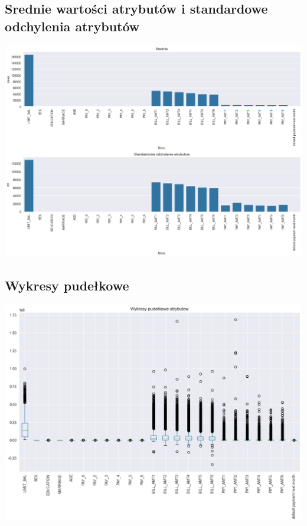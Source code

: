 \documentclass{article}
\begin{document}
\subsection{Srednie wartości atrybutów i standardowe odchylenia atrybutów}
\includegraphics[width=1\textwidth]{./srednie.png}

\subsection{Wykresy pudełkowe}
\includegraphics[width=1\textwidth]{./box_plots.png}
\end{document}
